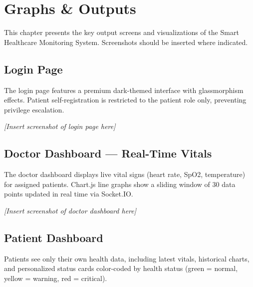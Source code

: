 \chapter{Graphs \& Outputs}

This chapter presents the key output screens and visualizations of the Smart Healthcare Monitoring System. Screenshots should be inserted where indicated.

\section{Login Page}
The login page features a premium dark-themed interface with glassmorphism effects. Patient self-registration is restricted to the patient role only, preventing privilege escalation.


\noindent\textit{[Insert screenshot of login page here]}

\section{Doctor Dashboard --- Real-Time Vitals}
The doctor dashboard displays live vital signs (heart rate, SpO2, temperature) for assigned patients. Chart.js line graphs show a sliding window of 30 data points updated in real time via Socket.IO.


\noindent\textit{[Insert screenshot of doctor dashboard here]}

\section{Patient Dashboard}
Patients see only their own health data, including latest vitals, historical charts, and personalized status cards color-coded by health status (green = normal, yellow = warning, red = critical).



